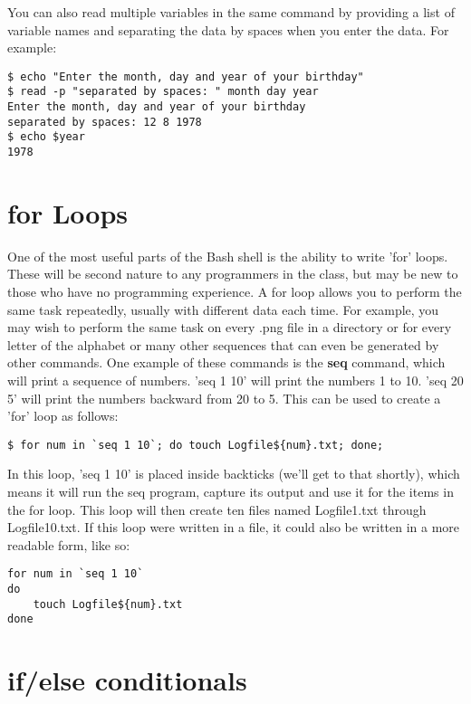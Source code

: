 You can also read multiple variables in the same command by providing a list of variable names and separating the data by spaces when you enter the data.  For example:

\begin{verbatim}
$ echo "Enter the month, day and year of your birthday"
$ read -p "separated by spaces: " month day year
Enter the month, day and year of your birthday
separated by spaces: 12 8 1978
$ echo $year
1978
\end{verbatim}

\section{for Loops}

One of the most useful parts of the Bash shell is the ability to write 'for' loops.  These will be second nature to any programmers in the class, but may be new to those who have no programming experience.  A for loop allows you to perform the same task repeatedly, usually with different data each time.  For example, you may wish to perform the same task on every .png file in a directory or for every letter of the alphabet or many other sequences that can even be generated by other commands.  One example of these commands is the \textbf{seq} command, which will print a sequence of numbers. 'seq 1 10' will print the numbers 1 to 10.  'seq 20 5' will print the numbers backward from 20 to 5.  This can be used to create a 'for' loop as follows:

\begin{verbatim}
$ for num in `seq 1 10`; do touch Logfile${num}.txt; done;
\end{verbatim}

In this loop, 'seq 1 10' is placed inside backticks (we'll get to that shortly), which means it will run the seq program, capture its output and use it for the items in the for loop.  This loop will then create ten files named Logfile1.txt through Logfile10.txt.  If this loop were written in a file, it could also be written in a more readable form, like so:

\begin{verbatim}
for num in `seq 1 10`
do
    touch Logfile${num}.txt
done
\end{verbatim}

\section{if/else conditionals}

